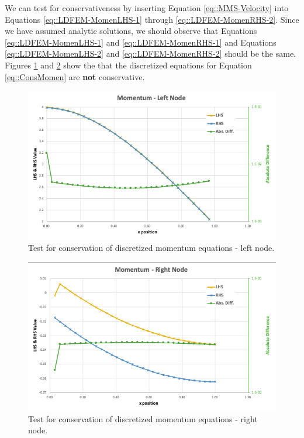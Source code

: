 \documentclass{article}
\begin{document}
We can test for conservativeness by inserting Equation \ref{eq::MMS-Velocity} into Equations \ref{eq::LDFEM-MomenLHS-1} through \ref{eq::LDFEM-MomenRHS-2}. Since we have assumed analytic solutions, we should observe that Equations \ref{eq::LDFEM-MomenLHS-1} and \ref{eq::LDFEM-MomenRHS-1} and Equations \ref{eq::LDFEM-MomenLHS-2} and \ref{eq::LDFEM-MomenRHS-2} should be the same. Figures \ref{fig::Momen-1} and \ref{fig::Momen-2} show the that the discretized equations for Equation \ref{eq::ConsMomen} are \textbf{not} conservative.
\begin{figure}[h!]
\centering
\includegraphics[scale=0.35]{./figures/Momen_1}
\caption{Test for conservation of discretized momentum equations - left node.}
\label{fig::Momen-1}
\end{figure}
\begin{figure}[h!]
\centering
\includegraphics[scale=0.35]{./figures/Momen_2}
\caption{Test for conservation of discretized momentum equations - right node.}
\label{fig::Momen-2}
\end{figure}
\end{document}
